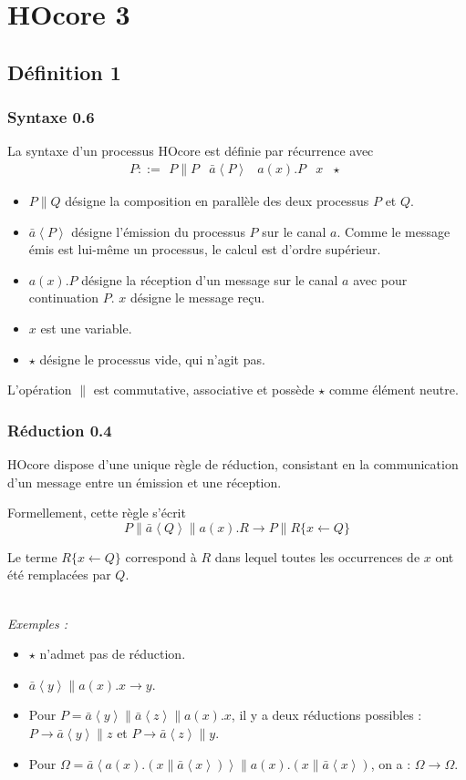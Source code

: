 \documentclass[11pt]{article}
\newcommand{\send}[2]{\bar{#1}\left\langle #2\right\rangle}
\newcounter{c_theo}
\newcounter{c_def}
\begin{document}
\section{HOcore 3}
\label{sec-2}
\subsection{Définition 1}
\label{sec-2-1}
\subsubsection{Syntaxe 0.6}
\label{sec-2-1-1}

La syntaxe d'un processus HOcore est définie par récurrence avec
\[P::=\begin{array}{c|c|c|c|c}
P \parallel P & \send{a}P & a(x).P & x & \star
\end{array}\]
\begin{itemize}
	\item $P\parallel Q$ désigne la composition en parallèle des deux processus $P$ et $Q$.
	\item $\send{a}P$ désigne l'émission du processus $P$ sur le canal $a$. Comme le message émis est lui-même un processus, le calcul est d'ordre supérieur.
	\item $a(x).P$ désigne la réception d'un message sur le canal $a$ avec pour continuation $P$. $x$ désigne le message reçu.
	\item $x$ est une variable.
	\item $\star$ désigne le processus vide, qui n'agit pas.
\end{itemize}

L'opération $\parallel$ est commutative, associative et possède $\star$ comme élément neutre.

\subsubsection{Réduction 0.4}
\label{sec-2-1-2}

HOcore dispose d'une unique règle de réduction, consistant en la communication d'un message entre un émission et une réception.

Formellement, cette règle s'écrit
\[P\parallel \send{a}Q \parallel a(x).R \to P\parallel
R\{x\gets Q\}\]

Le terme $R\{x\gets Q\}$ correspond à $R$ dans lequel toutes les occurrences de $x$ ont été remplacées par $Q$.


\textsl{\\Exemples :}
\begin{itemize}
	\item $\star$ n'admet pas de réduction.
	\item $\send{a}y\parallel a(x).x\to y$.
	\item Pour $P = \send{a}y \parallel \send{a}z \parallel a(x).x$, il y a deux réductions possibles : $P \to \send{a}y\parallel z$ et $P \to \send{a}z \parallel y$.
	\item Pour $\Omega = \send{a}{a(x).(x\parallel \send{a}x)} \parallel a(x).(x\parallel \send{a}x)$, on a : $\Omega \to \Omega$.
\end{itemize}
\end{document}
